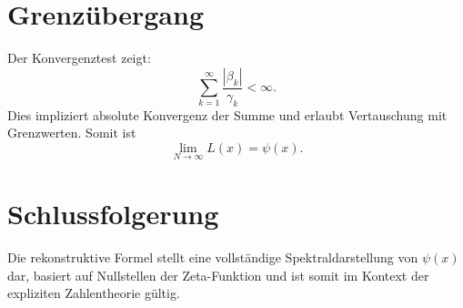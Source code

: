 \documentclass[12pt]{article}
\begin{document}
\section*{Grenzübergang}

Der Konvergenztest zeigt:
\[
\sum_{k=1}^\infty \frac{|\beta_k|}{\gamma_k} < \infty.
\]
Dies impliziert absolute Konvergenz der Summe und erlaubt Vertauschung mit Grenzwerten. Somit ist
\[
\lim_{N \to \infty} L(x) = \psi(x).
\]

\section*{Schlussfolgerung}

Die rekonstruktive Formel stellt eine vollständige Spektraldarstellung von \( \psi(x) \) dar, basiert auf Nullstellen der Zeta-Funktion und ist somit im Kontext der expliziten Zahlentheorie gültig.
\end{document}
